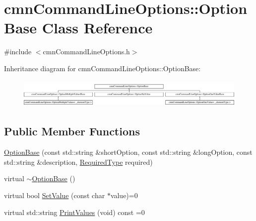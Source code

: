 \hypertarget{classcmn_command_line_options_1_1_option_base}{}\section{cmn\+Command\+Line\+Options\+:\+:Option\+Base Class Reference}
\label{classcmn_command_line_options_1_1_option_base}


{\ttfamily \#include $<$cmn\+Command\+Line\+Options.\+h$>$}

Inheritance diagram for cmn\+Command\+Line\+Options\+:\+:Option\+Base\+:\begin{figure}[H]
\begin{center}
\leavevmode
\includegraphics[height=1.424936cm]{dc/dd4/classcmn_command_line_options_1_1_option_base}
\end{center}
\end{figure}
\subsection*{Public Member Functions}
\begin{DoxyCompactItemize}
\item 
\hyperlink{classcmn_command_line_options_1_1_option_base_ac8abda74a567eea97e393386dd151065}{Option\+Base} (const std\+::string \&short\+Option, const std\+::string \&long\+Option, const std\+::string \&description, \hyperlink{group__cisst_common_gac239a3ca62dd4e3b391824f6f1a97c76}{Required\+Type} required)
\item 
virtual \hyperlink{classcmn_command_line_options_1_1_option_base_aa591fb2235a2923173c494a078ae24d8}{$\sim$\+Option\+Base} ()
\item 
virtual bool \hyperlink{classcmn_command_line_options_1_1_option_base_a738dbf56caefe3ee0f5eb9c3cc33bdd6}{Set\+Value} (const char $\ast$value)=0
\item 
virtual std\+::string \hyperlink{classcmn_command_line_options_1_1_option_base_ad21a08c2e066fc6948ab203e75a4fa80}{Print\+Values} (void) const =0
\end{DoxyCompactItemize}
